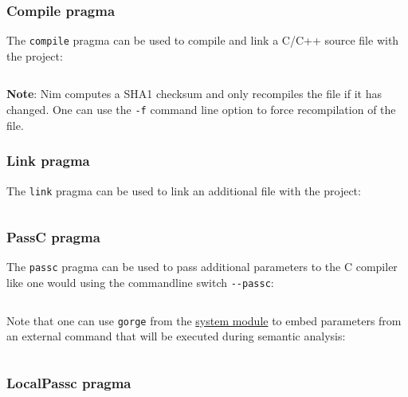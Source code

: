 \begin{verbatim}
\end{verbatim}

\hypertarget{compile-pragma}{%
\subsubsection{Compile pragma}\label{compile-pragma}}

The \texttt{compile} pragma can be used to compile and link a C/C++
source file with the project:

\begin{verbatim}
\end{verbatim}

\textbf{Note}: Nim computes a SHA1 checksum and only recompiles the file
if it has changed. One can use the \texttt{-f} command line option to
force recompilation of the file.

\hypertarget{link-pragma}{%
\subsubsection{Link pragma}\label{link-pragma}}

The \texttt{link} pragma can be used to link an additional file with the
project:

\begin{verbatim}
\end{verbatim}

\hypertarget{passc-pragma}{%
\subsubsection{PassC pragma}\label{passc-pragma}}

The \texttt{passc} pragma can be used to pass additional parameters to
the C compiler like one would using the commandline switch
\texttt{-\/-passc}:

\begin{verbatim}
\end{verbatim}

Note that one can use \texttt{gorge} from the \href{system.html}{system
module} to embed parameters from an external command that will be
executed during semantic analysis:

\begin{verbatim}
\end{verbatim}

\hypertarget{localpassc-pragma}{%
\subsubsection{LocalPassc pragma}\label{localpassc-pragma}}


